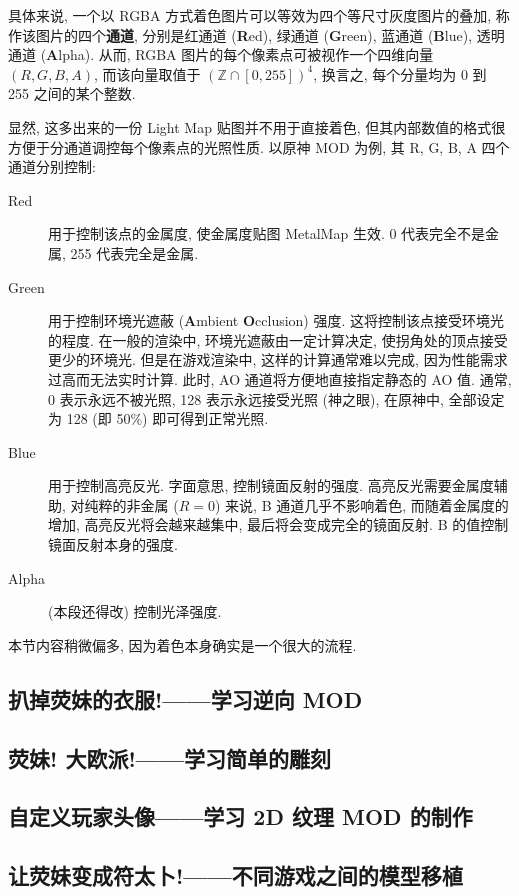             {\par 具体来说, 一个以 RGBA 方式着色图片可以等效为四个等尺寸灰度图片的叠加, 称作该图片的四个\textbf{通道}, 分别是红通道 (\textbf{R}ed), 绿通道 (\textbf{G}reen), 蓝通道 (\textbf{B}lue), 透明通道 (\textbf{A}lpha). 从而, RGBA 图片的每个像素点可被视作一个四维向量 \((R,G,B,A)\), 而该向量取值于 \((\mathbb{Z}\cap[0,255])^4\), 换言之, 每个分量均为 0 到 255 之间的某个整数.
            \par 显然, 这多出来的一份 Light Map 贴图并不用于直接着色, 但其内部数值的格式很方便于分通道调控每个像素点的光照性质. 以原神 MOD 为例, 其 R, G, B, A 四个通道分别控制: 
                \begin{description}
                    \item[Red] 用于控制该点的金属度, 使金属度贴图 MetalMap 生效. 0 代表完全不是金属, 255 代表完全是金属.
                    \item[Green] 用于控制环境光遮蔽 (\textbf{A}mbient \textbf{O}cclusion) 强度. 这将控制该点接受环境光的程度. 在一般的渲染中, 环境光遮蔽由一定计算决定, 使拐角处的顶点接受更少的环境光. 但是在游戏渲染中, 这样的计算通常难以完成, 因为性能需求过高而无法实时计算. 此时, AO 通道将方便地直接指定静态的 AO 值. 通常, 0 表示永远不被光照, 128 表示永远接受光照 (神之眼), 在原神中, 全部设定为 128 (即 50\%) 即可得到正常光照.
                    \item[Blue] 用于控制高亮反光. 字面意思, 控制镜面反射的强度. 高亮反光需要金属度辅助, 对纯粹的非金属 ($R=0$) 来说, B 通道几乎不影响着色, 而随着金属度的增加, 高亮反光将会越来越集中, 最后将会变成完全的镜面反射. B 的值控制镜面反射本身的强度.
                    \item[Alpha] (本段还得改) 控制光泽强度. 
                \end{description}
}
\fi
            \par 
            \par 本节内容稍微偏多, 因为着色本身确实是一个很大的流程. 
        \subsection{扒掉荧妹的衣服!——学习逆向 MOD}
        \subsection{荧妹! 大欧派!——学习简单的雕刻}
        \subsection{自定义玩家头像——学习 2D 纹理 MOD 的制作}
        \subsection{让荧妹变成符太卜!——不同游戏之间的模型移植}
